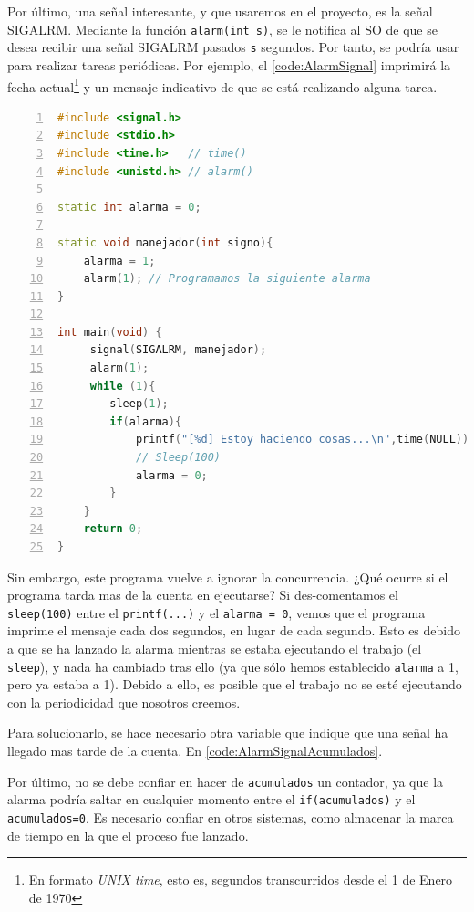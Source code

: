 Por último, una señal interesante, y que usaremos en el proyecto, es la señal \gls{SIGALRM}. Mediante la función \texttt{alarm(int s)}, se le notifica al \gls{SO} 
de que se desea recibir una señal \gls{SIGALRM} pasados \texttt{s} segundos. Por tanto, se podría usar para realizar 
tareas periódicas. Por ejemplo, el \lstlistingname{} \ref{code:AlarmSignal} imprimirá la fecha actual\footnote{En 
formato \emph{UNIX time}, esto es, segundos transcurridos desde el 1 de Enero de 1970} y un mensaje 
indicativo de que se está realizando alguna tarea.

\begin{lstlisting}[language=C++,caption={Ejemplo de uso de \gls{SIGALRM}}, 
breaklines=true, label=code:AlarmSignal,numbers=left,float=htbp]
#include <signal.h>
#include <stdio.h>
#include <time.h>   // time()
#include <unistd.h> // alarm()

static int alarma = 0;

static void manejador(int signo){
    alarma = 1;
    alarm(1); // Programamos la siguiente alarma
}

int main(void) {
     signal(SIGALRM, manejador);
     alarm(1);
     while (1){
        sleep(1);
        if(alarma){
            printf("[%d] Estoy haciendo cosas...\n",time(NULL));
            // Sleep(100)
            alarma = 0;
        }
    }
    return 0;
}
\end{lstlisting}

Sin embargo, este programa vuelve a ignorar la concurrencia. ¿Qué ocurre si el programa tarda mas de la cuenta en 
ejecutarse? Si des-comentamos el \texttt{sleep(100)} entre el \texttt{printf(...)} y el \texttt{alarma = 0}, vemos que 
el programa imprime el mensaje cada dos segundos, en lugar de cada segundo. Esto es debido a que se ha lanzado la 
alarma mientras se estaba ejecutando el trabajo (el \texttt{sleep}), y nada ha cambiado tras ello (ya que sólo hemos 
establecido \texttt{alarma} a 1, pero ya estaba a 1). Debido a ello, es posible que el trabajo no se esté ejecutando 
con la periodicidad que nosotros creemos.

Para solucionarlo, se hace necesario otra variable que indique que una señal ha llegado mas tarde de la cuenta. En 
\lstlistingname{} \ref{code:AlarmSignalAcumulados}. 

Por último, no se debe confiar en hacer de \texttt{acumulados} un contador, ya que la alarma podría saltar en cualquier 
momento entre el \texttt{if(acumulados)} y el \texttt{acumulados=0}. Es necesario confiar en otros sistemas, como 
almacenar la marca de tiempo en la que el proceso fue lanzado.


